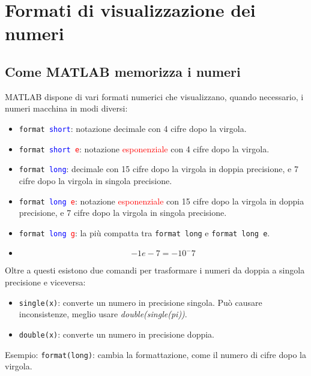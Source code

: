 \chapter{Formati di visualizzazione dei numeri}
\section{Come MATLAB memorizza i numeri}
MATLAB dispone di vari formati numerici che visualizzano, quando necessario, i numeri macchina in modi diversi:
\begin{itemize}

	\item	\texttt{format \textcolor{blue}{short}}: notazione decimale con 4 cifre dopo la virgola.
	
	\item	\texttt{format \textcolor{blue}{short} \textcolor{red}{e}}: notazione \textcolor{red}{esponenziale} 
			con 4 cifre dopo la virgola.
			
	\item	\texttt{format \textcolor{blue}{long}}: decimale con 15 cifre dopo la virgola in doppia precisione, e 
			7 cifre dopo la virgola in singola precisione.
			
	\item	\texttt{format \textcolor{blue}{long} \textcolor{red}{e}}: notazione \textcolor{red}{esponenziale} 
			con 15 cifre dopo la virgola in doppia precisione, e 7 cifre dopo la virgola in singola precisione.
			
	\item	\texttt{format \textcolor{blue}{long} \textcolor{red}{g}}: la più compatta tra \texttt{format long} e 
			\texttt{format long e}.
     
     \item \texttt{$$-1e-7 = -10^-7$$}

\end{itemize}

Oltre a questi esistono due comandi per trasformare i numeri da doppia a singola precisione e viceversa:
\begin{itemize}

	\item	\texttt{single(x)}: converte un numero in precisione singola. Può causare inconsistenze, meglio usare 
	\textit{double(single(pi))}.
	
	\item 	\texttt{double(x)}: converte un numero in precisione doppia.
\end{itemize}

Esempio: \texttt{format(long)}: cambia la formattazione, come il numero di cifre dopo la virgola.
